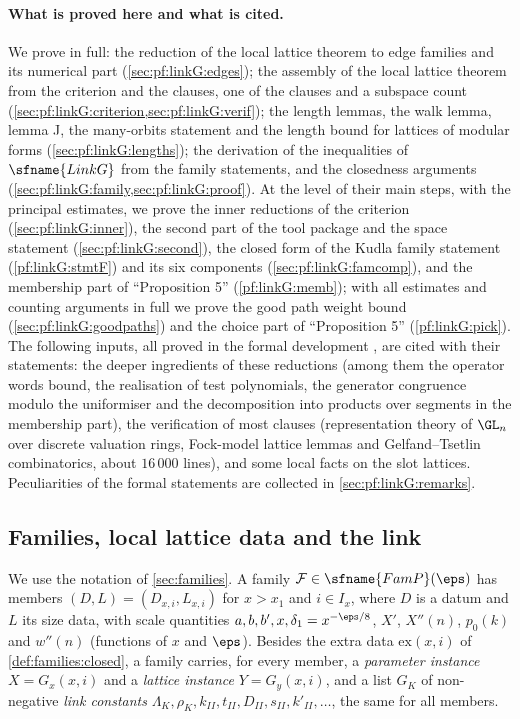 \paragraph{What is proved here and what is cited.}
We prove in full: the reduction of the local lattice theorem to edge families and its numerical part
(\cref{sec:pf:linkG:edges}); the assembly of the local lattice theorem from the criterion and the clauses, one of the
clauses and a subspace count (\cref{sec:pf:linkG:criterion,sec:pf:linkG:verif}); the length lemmas, the walk lemma, lemma J,
the many-orbits statement and the length bound for lattices of modular forms (\cref{sec:pf:linkG:lengths}); the
derivation of the inequalities of $\sfname{LinkG}$ from the family statements, and the closedness arguments
(\cref{sec:pf:linkG:family,sec:pf:linkG:proof}). At the level of their main steps, with the principal estimates, we prove
the inner reductions of the criterion (\cref{sec:pf:linkG:inner}), the second part of the tool package and the space
statement (\cref{sec:pf:linkG:second}), the closed form of the Kudla family statement (\cref{pf:linkG:stmtF}) and its six
components (\cref{sec:pf:linkG:famcomp}), and the membership part of ``Proposition 5'' (\cref{pf:linkG:memb}); with all
estimates and counting arguments in full we prove the good path weight bound (\cref{sec:pf:linkG:goodpaths}) and the choice
part of ``Proposition 5'' (\cref{pf:linkG:pick}). The
following inputs, all proved in the formal development \cite{LeanSource2026}, are cited with their statements: the deeper
ingredients of these reductions (among them the operator words bound, the realisation of test polynomials, the generator
congruence modulo the uniformiser and the decomposition into products over segments in the membership part), the verification of
most clauses (representation theory of $\GL_n$ over discrete valuation rings, Fock-model lattice lemmas and
Gelfand--Tsetlin combinatorics, about $16\,000$ lines), and some local facts on the slot lattices. Peculiarities of the
formal statements are collected in \cref{sec:pf:linkG:remarks}.

\subsection{Families, local lattice data and the link}\label{sec:pf:linkG:link}

We use the notation of \cref{sec:families}. A family $\mathcal F\in\sfname{FamP}(\eps)$ has members
$(D,L)=(D_{x,i},L_{x,i})$ for $x>x_1$ and $i\in I_x$, where $D$ is a datum and $L$ its size data, with scale
quantities $a,b,b',x,\delta_1=x^{-\eps/8}$, $X'$, $X''(n)$, $p_0(k)$ and $w''(n)$ (functions of $x$ and $\eps$). Besides
the extra data $\mathrm{ex}(x,i)$ of \cref{def:families:closed}, a family carries, for every member, a
\emph{parameter instance} $X=G_x(x,i)$ and a \emph{lattice instance} $Y=G_y(x,i)$, and a list $G_K$ of
non-negative \emph{link constants} $\Lambda_K,\rho_K,k_{II},t_{II},D_{II},s_{II},k'_{II},\dots$, the same for
all members.

